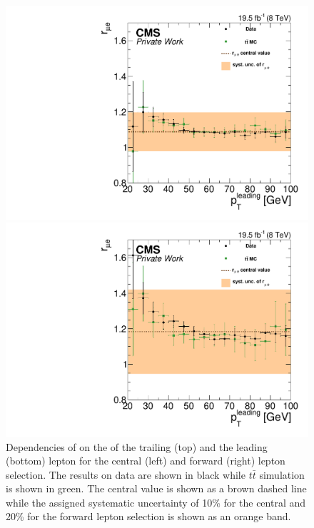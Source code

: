 \begin{figure}[htbp]
\begin{minipage}[t]{0.49\textwidth}
  \includegraphics[width=\textwidth]{plots/BG/rmue/rMuE_ZPeakControlCentral_Full2012_LeadingPt_trailingPt20.pdf}
\end{minipage}
\begin{minipage}[t]{0.49\textwidth}
\includegraphics[width=\textwidth]{plots/BG/rmue/rMuE_ZPeakControlForward_Full2012_LeadingPt_trailingPt20.pdf}
\end{minipage}

\caption{Dependencies of \rmue on the \pt of the trailing (top) and the leading (bottom) lepton for the central (left) and forward (right) lepton selection. The results on data are shown in black while $t\bar{t}$ simulation is shown in green. The central value is shown as a brown dashed line while the assigned systematic uncertainty of 10\% for the central and 20\% for the forward lepton selection is shown as an orange band.}
\label{fig:rmueDependenciesApp1}
\end{figure} 

